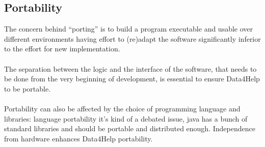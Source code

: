 \subsection{Portability}
The concern behind “porting” is to build a program executable and usable over different environments having effort to (re)adapt the software significantly inferior to the effort for new implementation. 
\\
\\
The separation between the logic and the interface of the software, that needs to be done from the very beginning of development, is essential to ensure Data4Help to be portable.  
\\
\\
Portability can also be affected by the choice of programming language and libraries: language portability it’s kind of a debated issue, java has a bunch of standard libraries and should be portable and distributed enough. Independence from hardware enhances Data4Help portability. 

